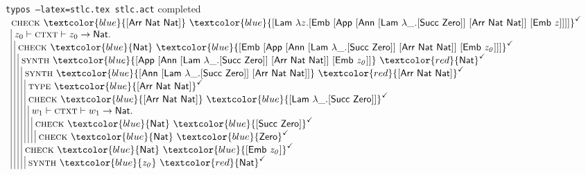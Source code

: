 \documentclass[xcolor=dvipsnames]{beamer}
\makeatletter
\newcommand{\typosBinding}[1]{#1 \vdash}
\newcommand{\typosPushing}[3]{\textsc{#1} \vdash #2 \to #3.}
\newcommand{\typosScope}[2]{\lambda #1. #2}
\newcommand{\typosAxiom}[1]{#1}
\newcommand{\typosDerivation}[2]{#1 \\ #2}
\newcommand{\typosBeginPrems}{\begin{array}{|@{\ }l@{}}}
\newcommand{\typosBetweenPrems}{\\}
\newcommand{\typosEndPrems}{\end{array}}
\newcommand{\typosInput}[1]{\textcolor{blue}{#1}}
\newcommand{\typosOutput}[1]{\textcolor{red}{#1}}
\newcommand{\typosCheckmark}{^\checkmark}
\newcommand{\enumNat}[0]{\mathsf{Nat}}
\newcommand{\enumZero}[0]{\mathsf{Zero}}
\newcommand{\tagAnnForTwo}[2]{[ \mathsf{Ann} \ #1 \ #2 ]}
\newcommand{\tagAppForTwo}[2]{[ \mathsf{App} \ #1 \ #2 ]}
\newcommand{\tagArrForTwo}[2]{[ \mathsf{Arr} \ #1 \ #2 ]}
\newcommand{\tagEmbForOne}[1]{[ \mathsf{Emb} \ #1 ]}
\newcommand{\tagLamForOne}[1]{[ \mathsf{Lam} \ #1 ]}
\newcommand{\tagSuccForOne}[1]{[ \mathsf{Succ} \ #1 ]}
\newcommand{\callingtype}[1]{\textsc{type}\ #1}
\newcommand{\callingcheck}[2]{\textsc{check}\ #1 \ #2}
\newcommand{\callingsynth}[2]{\textsc{synth}\ #1 \ #2}
\makeatother
\begin{document}
\begin{frame}[fragile]{\texttt{typos --latex=stlc.tex stlc.act} completed}
$\displaystyle
\begin{array}{l}
\typosDerivation{\callingcheck{\typosInput{\tagArrForTwo{\enumNat}{\enumNat}}}{\typosInput{\tagLamForOne{\typosScope{z}{\tagEmbForOne{\tagAppForTwo{\tagAnnForTwo{\tagLamForOne{\typosScope{\_}{\tagSuccForOne{\enumZero}}}}{\tagArrForTwo{\enumNat}{\enumNat}}}{\tagEmbForOne{\mathit{z}}}}}}}} \typosCheckmark}
 {\typosBeginPrems
  \typosDerivation{\typosBinding{z_0}\typosPushing{ctxt}{z_0}{\enumNat}}
   {\typosBeginPrems
    \typosDerivation{\callingcheck{\typosInput{\enumNat}}{\typosInput{\tagEmbForOne{\tagAppForTwo{\tagAnnForTwo{\tagLamForOne{\typosScope{\_}{\tagSuccForOne{\enumZero}}}}{\tagArrForTwo{\enumNat}{\enumNat}}}{\tagEmbForOne{\mathit{z_0}}}}}} \typosCheckmark}
     {\typosBeginPrems
      \typosDerivation{\callingsynth{\typosInput{\tagAppForTwo{\tagAnnForTwo{\tagLamForOne{\typosScope{\_}{\tagSuccForOne{\enumZero}}}}{\tagArrForTwo{\enumNat}{\enumNat}}}{\tagEmbForOne{\mathit{z_0}}}}}{\typosOutput{\enumNat}} \typosCheckmark}
       {\typosBeginPrems
        \typosDerivation{\callingsynth{\typosInput{\tagAnnForTwo{\tagLamForOne{\typosScope{\_}{\tagSuccForOne{\enumZero}}}}{\tagArrForTwo{\enumNat}{\enumNat}}}}{\typosOutput{\tagArrForTwo{\enumNat}{\enumNat}}} \typosCheckmark}
         {\typosBeginPrems
          \typosAxiom{\callingtype{\typosInput{\tagArrForTwo{\enumNat}{\enumNat}}} \typosCheckmark}
          \typosBetweenPrems
          \typosDerivation{\callingcheck{\typosInput{\tagArrForTwo{\enumNat}{\enumNat}}}{\typosInput{\tagLamForOne{\typosScope{\_}{\tagSuccForOne{\enumZero}}}}} \typosCheckmark}
           {\typosBeginPrems
            \typosDerivation{\typosBinding{w_1}\typosPushing{ctxt}{w_1}{\enumNat}}
             {\typosBeginPrems
              \typosDerivation{\callingcheck{\typosInput{\enumNat}}{\typosInput{\tagSuccForOne{\enumZero}}} \typosCheckmark}
               {\typosBeginPrems
                \typosAxiom{\callingcheck{\typosInput{\enumNat}}{\typosInput{\enumZero}} \typosCheckmark}
                \typosEndPrems}
              \typosEndPrems}
            \typosEndPrems}
          \typosEndPrems}
        \typosBetweenPrems
        \typosDerivation{\callingcheck{\typosInput{\enumNat}}{\typosInput{\tagEmbForOne{\mathit{z_0}}}} \typosCheckmark}
         {\typosBeginPrems
          \typosAxiom{\callingsynth{\typosInput{\mathit{z_0}}}{\typosOutput{\enumNat}} \typosCheckmark}
          \typosEndPrems}
        \typosEndPrems}
      \typosEndPrems}
    \typosEndPrems}
  \typosEndPrems}
\end{array}
$
\end{frame}
\end{document}
